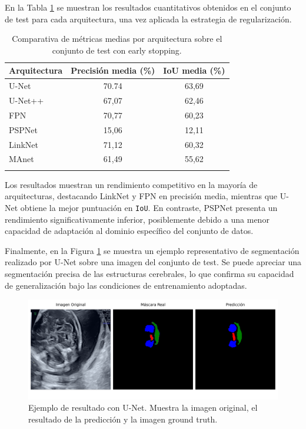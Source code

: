 En la Tabla \ref{tab:resultados_earlystopping} se muestran los resultados cuantitativos obtenidos en el conjunto de test para cada arquitectura, una vez aplicada la estrategia de regularización.

\begin{table}[h]
    \centering
    \begin{tabular}{lcc}
    \textbf{Arquitectura} & \textbf{Precisión media (\%)} & \textbf{IoU media (\%)} \\
    \hline
    U-Net             & 70.74 & 63,69\\
    U-Net++           & 67,07 & 62,46\\
    FPN               & 70,77 & 60,23\\
    PSPNet            & 15,06 & 12,11\\
    LinkNet           & 71,12 & 60,32\\
    MAnet             & 61,49 & 55,62\\
    \hfill
    \end{tabular}
    \caption{Comparativa de métricas medias por arquitectura sobre el conjunto de test con early stopping.} \label{tab:resultados_earlystopping}
\end{table}

Los resultados muestran un rendimiento competitivo en la mayoría de arquitecturas, destacando LinkNet y FPN en precisión media, mientras que U-Net obtiene la mejor puntuación en \texttt{IoU}. En contraste, PSPNet presenta un rendimiento significativamente inferior, posiblemente debido a una menor capacidad de adaptación al dominio específico del conjunto de datos.

Finalmente, en la Figura \ref{fig:resultado_unet} se muestra un ejemplo representativo de segmentación realizado por U-Net sobre una imagen del conjunto de test. Se puede apreciar una segmentación precisa de las estructuras cerebrales, lo que confirma su capacidad de generalización bajo las condiciones de entrenamiento adoptadas.


\begin{figure}[h]
    \centering
    \includegraphics[width=1.1\textwidth]{img/image1_unet.png}
    \caption{Ejemplo de resultado con U-Net. Muestra la imagen original, el resultado de la predicción y la imagen ground truth.}
    \label{fig:resultado_unet}
\end{figure}
 
